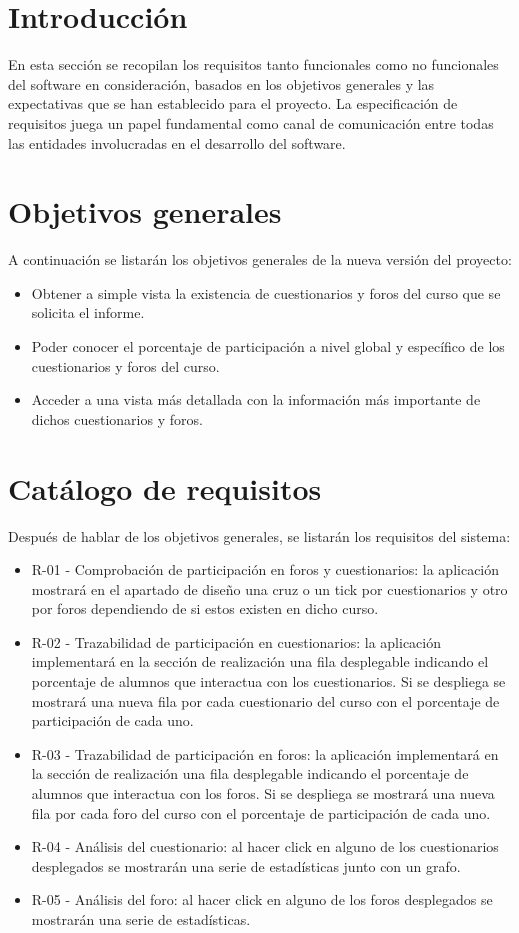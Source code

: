 \label{apendice:B}
\section{Introducción}
En esta sección se recopilan los requisitos tanto funcionales como no funcionales del software en consideración, basados en los objetivos generales y las expectativas que se han establecido para el proyecto. La especificación de requisitos juega un papel fundamental como canal de comunicación entre todas las entidades involucradas en el desarrollo del software.
\section{Objetivos generales}
A continuación se listarán los objetivos generales de la nueva versión del proyecto:
\begin{itemize}
	\item
	Obtener a simple vista la existencia de cuestionarios y foros del curso que se solicita el informe.
	\item
	Poder conocer el porcentaje de participación a nivel global y específico de los cuestionarios y foros del curso.
	\item
	Acceder a una vista más detallada con la información más importante de dichos cuestionarios y foros.
\end{itemize}

\section{Catálogo de requisitos}
Después de hablar de los objetivos generales, se listarán los requisitos del sistema:
\begin{itemize}
	\item R-01 - Comprobación de participación en foros y cuestionarios: la aplicación mostrará en el apartado de diseño una cruz o un tick por cuestionarios y otro por foros dependiendo de si estos existen en dicho curso.
	\item R-02 - Trazabilidad de participación en cuestionarios: la aplicación implementará en la sección de realización una fila desplegable indicando el porcentaje de alumnos que interactua con los cuestionarios. Si se despliega se mostrará una nueva fila por cada cuestionario del curso con el porcentaje de participación de cada uno.
	\item R-03 - Trazabilidad de participación en foros: la aplicación implementará en la sección de realización una fila desplegable indicando el porcentaje de alumnos que interactua con los foros. Si se despliega se mostrará una nueva fila por cada foro del curso con el porcentaje de participación de cada uno.
	\item R-04 - Análisis del cuestionario: al hacer click en alguno de los cuestionarios desplegados se mostrarán una serie de estadísticas junto con un grafo.
	\item R-05 - Análisis del foro: al hacer click en alguno de los foros desplegados se mostrarán una serie de estadísticas.
\end{itemize}

